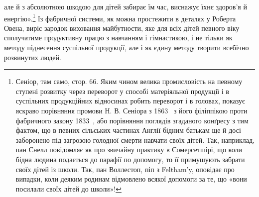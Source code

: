 але й з абсолютною шкодою для дітей забирає їм час, виснажує
їхнє здоров’я й енергію».\footnote{
Сеніор, там само, стор. 66. Яким чином велика промисловість на
певному ступені розвитку через переворот у способі матеріяльної продукції
і в суспільних продукційних відносинах робить переворот і в головах,
показує яскраво порівняння промови Н. В. Сеніора з 1863~ з його філіппікою
проти фабричного закону 1833~, або порівняння поглядів згаданого
конґресу з тим фактом, що в певних сільських частинах Англії бідним
батькам ще й досі заборонено під загрозою голодної смерти навчати
своїх дітей. Так, наприклад, пан Снелл повідомляє як про звичайну практику
в Сомерсетшірі, що коли бідна людина подається до парафії
по допомогу, то її примушують забрати своїх дітей із школи. Так, пан
Воллестоп, піп з Feltham’y, оповідає про випадки, коли деяким родинам
відмовлено всякої допомоги за те, що «вони посилали своїх дітей до
школи»!
} Із фабричної системи, як можна простежити
в деталях у Роберта Овена, виріс зародок виховання
майбутности, яке для всіх дітей певного віку сполучатиме продуктивну
працю з навчанням і гімнастикою, і не тільки як методу
піднесення суспільної продукції, але і як єдину методу творити
всебічно розвинутих людей.

